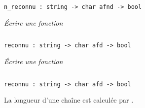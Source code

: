 \begin{lstlisting}
n_reconnu : string -> char afnd -> bool
\end{lstlisting}
\begin{Exercise}\it 
Écrire une fonction 
\end{Exercise} 
\begin{Answer}
\begin{lstlisting}
\end{lstlisting}
\end{Answer} 
\begin{lstlisting}
reconnu : string -> char afd -> bool
\end{lstlisting}
\begin{Exercise}\it 
Écrire une fonction 
\end{Exercise} 
\begin{Answer}
\begin{lstlisting}
\end{lstlisting}
\end{Answer} 
\begin{lstlisting}
reconnu : string -> char afd -> bool
\end{lstlisting}
La longueur d'une chaîne est calculée par .

